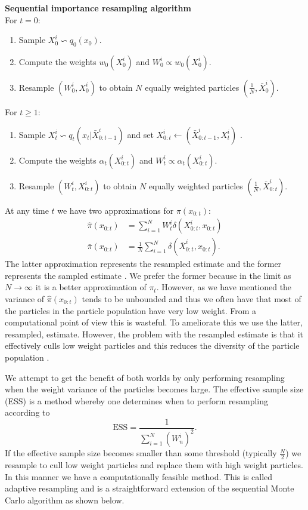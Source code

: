 \textbf{Sequential importance resampling algorithm} \\
For $t=0$:
\begin{enumerate}
\item
Sample $X^i_0 \backsim q_0(x_0)$.
\item
Compute the weights $w_0(X_0^i)$ and $W^i_0 \propto w_0(X^i_0)$.
\item
Resample $(W^i_0, X^i_0)$ to obtain $N$ equally weighted particles $(\frac{1}{N}, \bar{X}^i_0)$.
\end{enumerate}
For $t \geq 1$:
\begin{enumerate}
\item
Sample $X^i_t \backsim q_t(x_t|\bar{X}^i_{0:t-1})$ and set ${X}^i_{0:t} \leftarrow (\bar{X}^i_{0:t-1}, X^i_t)$ .
\item
Compute the weights $\alpha_t(X^i_{0:t})$ and $W^i_t \propto \alpha_t(X^i_{0:t})$.
\item
Resample $(W^i_t, X^i_{0:t})$ to obtain $N$ equally weighted particles $(\frac{1}{N}, \bar{X}^i_{0:t})$.
\end{enumerate}
At any time $t$ we have two approximations for $\pi(x_{0:t})$:
\begin{equation}
\begin{aligned}
\hat{\pi}(x_{0:t}) &= \sum_{i=1}^N W^i_t \delta(X^i_{0:t}, x_{0:t}) \\
\bar{\pi}(x_{0:t}) &= \frac{1}{N}\sum_{i=1}^N \delta(\bar{X}^i_{0:t}, x_{0:t}).
\end{aligned}
\label{eq_smc_algo}
\end{equation}
The latter approximation represents the resampled estimate and the former represents the sampled estimate \cite{pftut}. We prefer the former because in the limit as $N \rightarrow \infty$ it is a better approximation of $\pi_t$. However, as we have mentioned the variance of $\hat{\pi}(x_{0:t})$ tends to be unbounded and thus we often have that most of the particles in the particle population have very low weight. From a computational point of view this is wasteful. To ameliorate this we use the latter, resampled, estimate. However, the problem with the resampled estimate is that it effectively culls low weight particles and this reduces the diversity of the particle population \cite{murphy1}. 

We attempt to get the benefit of both worlds by only performing resampling when the weight variance of the particles becomes large. The effective sample size (ESS) is a method whereby one determines when to perform resampling according to 
\begin{equation}
\text{ESS} = \frac{1}{\sum_{i=1}^N (W^i_n)^2}.
\label{eq_ess}
\end{equation} 
If the effective sample size becomes smaller than some threshold (typically $\frac{N}{2}$) we resample to cull low weight particles and replace them with high weight particles. In this manner we have a computationally feasible method. This is called adaptive resampling and is a straightforward extension of the sequential Monte Carlo algorithm as shown below.

